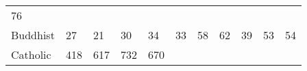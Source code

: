 \documentclass[]{article}
\begin{document}
\begin{longtable}[]{@{}lllllllllll@{}}
\begin{minipage}[t]{0.11\columnwidth}
76\strut
\end{minipage}\tabularnewline
\begin{minipage}[t]{0.14\columnwidth}\raggedright
Buddhist\strut
\end{minipage} & \begin{minipage}[t]{0.04\columnwidth}\raggedright
27\strut
\end{minipage} & \begin{minipage}[t]{0.05\columnwidth}\raggedright
21\strut
\end{minipage} & \begin{minipage}[t]{0.05\columnwidth}\raggedright
30\strut
\end{minipage} & \begin{minipage}[t]{0.05\columnwidth}\raggedright
34\strut
\end{minipage} & \begin{minipage}[t]{0.05\columnwidth}\raggedright
33\strut
\end{minipage} & \begin{minipage}[t]{0.05\columnwidth}\raggedright
58\strut
\end{minipage} & \begin{minipage}[t]{0.06\columnwidth}\raggedright
62\strut
\end{minipage} & \begin{minipage}[t]{0.06\columnwidth}\raggedright
39\strut
\end{minipage} & \begin{minipage}[t]{0.04\columnwidth}\raggedright
53\strut
\end{minipage} & \begin{minipage}[t]{0.11\columnwidth}\raggedright
54\strut
\end{minipage}\tabularnewline
\begin{minipage}[t]{0.14\columnwidth}\raggedright
Catholic\strut
\end{minipage} & \begin{minipage}[t]{0.04\columnwidth}\raggedright
418\strut
\end{minipage} & \begin{minipage}[t]{0.05\columnwidth}\raggedright
617\strut
\end{minipage} & \begin{minipage}[t]{0.05\columnwidth}\raggedright
732\strut
\end{minipage} & \begin{minipage}[t]{0.05\columnwidth}\raggedright
670\strut
\end{minipage} & \begin{minipage}[t]{0.05\columnwidth}\raggedright

\end{minipage}
\end{longtable}
\end{document}
